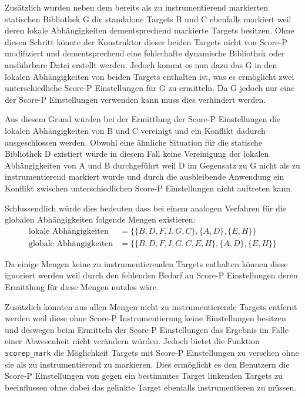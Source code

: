 \documentclass[german,proseminar,hyperref,utf8,lof]{zihpub}
\begin{document}
    Zusätzlich wurden neben dem bereits als zu instrumentierend markierten statischen Bibliothek G
    die standalone Targets B und C ebenfalls markiert weil deren lokale Abhängigkeiten dementsprechend
    markierte Targets besitzen.
    Ohne diesen Schritt könnte der Konstruktor dieser beiden Targets nicht von Score-P modifiziert und
    dementsprechend eine fehlerhafte dynamische Bibliothek oder ausführbare Datei erstellt werden.
    Jedoch kommt es nun dazu das G in den lokalen Abhängigkeiten von beiden Targets enthalten ist,
    was es ermöglicht zwei unterschiedliche Score-P Einstellungen für G zu ermitteln.
    Da G jedoch nur eine der Score-P Einstellungen verwenden kann muss dies verhindert werden.

    Aus diesem Grund würden bei der Ermittlung der Score-P Einstellungen die lokalen Abhängigkeiten
    von B und C vereinigt und ein Konflikt dadurch ausgeschlossen werden.
    Obwohl eine ähnliche Situation für die statische Bibliothek D existiert würde in diesem Fall keine
    Vereinigung der lokalen Abhängigkeiten von A und B durchgeführt weil D im Gegensatz zu G nicht
    als zu instrumentierend markiert wurde und durch die ausbleibende Anwendung ein Konflikt zwischen
    unterschiedlichen Score-P Einstellungen nicht auftreten kann.

    Schlussendlich würde dies bedeuten dass bei einem analogen Verfahren für die globalen Abhängigkeiten
    folgende Mengen existieren:
    \begin{align*}
        \text{lokale Abhängigkeiten} &= \{ \{ B, D, F, I, G, C \}, \{ A, D \}, \{ E, H \} \} \\
        \text{globale Abhängigkeiten} &= \{ \{ B, D, F, I, G, C, E, H \}, \{ A, D \}, \{ E, H \} \}
    \end{align*}

    Da einige Mengen keine zu instrumentierenden Targets enthalten können diese ignoriert werden
    weil durch den fehlenden Bedarf an Score-P Einstellungen deren Ermittlung für diese Mengen
    nutzlos wäre.

    Zusätzlich könnten aus allen Mengen nicht zu instrumentierende Targets entfernt werden weil
    diese ohne Score-P Instrumentierung keine Einstellungen besitzen und deswegen beim Ermitteln
    der Score-P Einstellungen das Ergebnis im Falle einer Abwesenheit nicht verändern würden.
    Jedoch bietet die Funktion \texttt{scorep\_mark} die Möglichkeit Targets mit Score-P Einstellungen
    zu versehen ohne sie als zu instrumentierend zu markieren.
    Dies ermöglicht es den Benutzern die Score-P Einstellungen von gegen ein bestimmtes Target linkenden
    Targets zu beeinflussen ohne dabei das gelinkte Target ebenfalls instrumentieren zu müssen.
\end{document}
